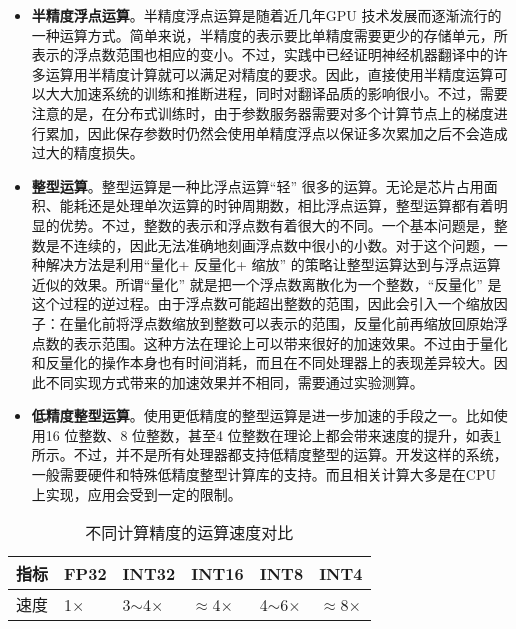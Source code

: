 \begin{itemize}
\vspace{0.5em}
\item {\small\sffamily\bfseries{半精度浮点运算}}。半精度浮点运算是随着近几年GPU 技术发展而逐渐流行的一种运算方式。简单来说，半精度的表示要比单精度需要更少的存储单元，所表示的浮点数范围也相应的变小。不过，实践中已经证明神经机器翻译中的许多运算用半精度计算就可以满足对精度的要求。因此，直接使用半精度运算可以大大加速系统的训练和推断进程，同时对翻译品质的影响很小。不过，需要注意的是，在分布式训练时，由于参数服务器需要对多个计算节点上的梯度进行累加，因此保存参数时仍然会使用单精度浮点以保证多次累加之后不会造成过大的精度损失。
\vspace{0.5em}
\item {\small\sffamily\bfseries{整型运算}}。整型运算是一种比浮点运算“轻” 很多的运算。无论是芯片占用面积、能耗还是处理单次运算的时钟周期数，相比浮点运算，整型运算都有着明显的优势。不过，整数的表示和浮点数有着很大的不同。一个基本问题是，整数是不连续的，因此无法准确地刻画浮点数中很小的小数。对于这个问题，一种解决方法是利用“量化+ 反量化+ 缩放” 的策略让整型运算达到与浮点运算近似的效果。所谓“量化” 就是把一个浮点数离散化为一个整数，“反量化” 是这个过程的逆过程。由于浮点数可能超出整数的范围，因此会引入一个缩放因子：在量化前将浮点数缩放到整数可以表示的范围，反量化前再缩放回原始浮点数的表示范围。这种方法在理论上可以带来很好的加速效果。不过由于量化和反量化的操作本身也有时间消耗，而且在不同处理器上的表现差异较大。因此不同实现方式带来的加速效果并不相同，需要通过实验测算。
\vspace{0.5em}
\item {\small\sffamily\bfseries{低精度整型运算}}。使用更低精度的整型运算是进一步加速的手段之一。比如使用16 位整数、8 位整数，甚至4 位整数在理论上都会带来速度的提升，如表\ref{tab:14-3}所示。不过，并不是所有处理器都支持低精度整型的运算。开发这样的系统，一般需要硬件和特殊低精度整型计算库的支持。而且相关计算大多是在CPU 上实现，应用会受到一定的限制。
\vspace{0.5em}
\end{itemize}

\begin{table}[htp]
\centering
\caption{不同计算精度的运算速度对比\protect\footnotemark}
\begin{tabular}{ l | l  l l l l}
\rule{0pt}{13pt} 指标 & FP32 &INT32 &INT16 &INT8 &INT4 \\ \hline
\rule{0pt}{13pt} 速度 & 1$\times$ & 3$\sim$4$\times$ & $\approx$4$\times$ & 4$\sim$6$\times$ & $\approx$8$\times$
\end{tabular}
\label{tab:14-3}
\end{table}

